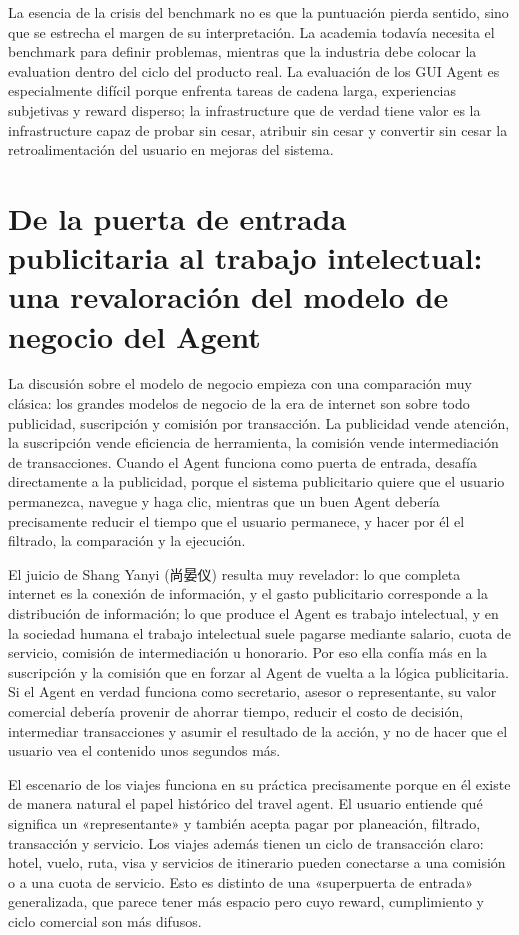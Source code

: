 \documentclass[a4paper]{article}
\begin{document}
La esencia de la crisis del benchmark no es que la puntuación pierda sentido, sino que se estrecha el margen de su interpretación. La academia todavía necesita el benchmark para definir problemas, mientras que la industria debe colocar la evaluation dentro del ciclo del producto real. La evaluación de los GUI Agent es especialmente difícil porque enfrenta tareas de cadena larga, experiencias subjetivas y reward disperso; la infrastructure que de verdad tiene valor es la infrastructure capaz de probar sin cesar, atribuir sin cesar y convertir sin cesar la retroalimentación del usuario en mejoras del sistema.

\section{De la puerta de entrada publicitaria al trabajo intelectual: una revaloración del modelo de negocio del Agent}

La discusión sobre el modelo de negocio empieza con una comparación muy clásica: los grandes modelos de negocio de la era de internet son sobre todo publicidad, suscripción y comisión por transacción. La publicidad vende atención, la suscripción vende eficiencia de herramienta, la comisión vende intermediación de transacciones. Cuando el Agent funciona como puerta de entrada, desafía directamente a la publicidad, porque el sistema publicitario quiere que el usuario permanezca, navegue y haga clic, mientras que un buen Agent debería precisamente reducir el tiempo que el usuario permanece, y hacer por él el filtrado, la comparación y la ejecución.

El juicio de Shang Yanyi (尚晏仪) resulta muy revelador: lo que completa internet es la conexión de información, y el gasto publicitario corresponde a la distribución de información; lo que produce el Agent es trabajo intelectual, y en la sociedad humana el trabajo intelectual suele pagarse mediante salario, cuota de servicio, comisión de intermediación u honorario. Por eso ella confía más en la suscripción y la comisión que en forzar al Agent de vuelta a la lógica publicitaria. Si el Agent en verdad funciona como secretario, asesor o representante, su valor comercial debería provenir de ahorrar tiempo, reducir el costo de decisión, intermediar transacciones y asumir el resultado de la acción, y no de hacer que el usuario vea el contenido unos segundos más.

El escenario de los viajes funciona en su práctica precisamente porque en él existe de manera natural el papel histórico del travel agent. El usuario entiende qué significa un «representante» y también acepta pagar por planeación, filtrado, transacción y servicio. Los viajes además tienen un ciclo de transacción claro: hotel, vuelo, ruta, visa y servicios de itinerario pueden conectarse a una comisión o a una cuota de servicio. Esto es distinto de una «superpuerta de entrada» generalizada, que parece tener más espacio pero cuyo reward, cumplimiento y ciclo comercial son más difusos.
\end{document}

